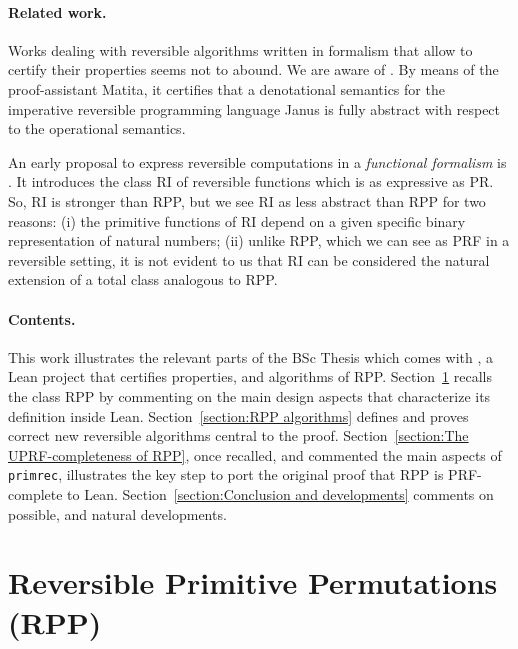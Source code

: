 \documentclass[runningheads]{llncs}
\newcommand{\RPP}{\textsf{RPP}\xspace}
\newcommand{\PRF}{\textsf{PRF}\xspace}
\newcommand{\PR}{\textsf{PR}\xspace}
\newcommand{\LEAN}{\textsf{Lean}\xspace}
\newcommand{\JMF}{\textsf{RI}\xspace} %
\newcommand{\Janus}{\textsf{Janus}\xspace}
\newcommand{\Matita}{\textsf{Matita}\xspace}
\begin{document}
\paragraph{Related work.}
Works dealing with reversible algorithms written in formalism that allow to certify their properties seems not to abound. We are aware of \cite{paoliniTYPES2015}. By means of the proof-assistant \Matita \cite{Asperti2007}, it certifies that a denotational semantics for the imperative reversible programming language \Janus \cite[Section 8.3.3]{perumalla2013chc} is fully abstract with respect to the operational semantics.

An early proposal to express reversible computations in a \emph{functional formalism} is \cite{jacopini89tcs}. It introduces the class \JMF of reversible functions which is as expressive as \PR. So, \JMF is stronger than \RPP, but we see \JMF as less abstract than \RPP for two reasons: (i) the primitive functions of \JMF depend on a given specific binary representation of natural numbers; (ii) unlike \RPP, which we can see as \PRF in a reversible setting, it is not evident to us that \JMF can be considered the natural extension of a total class analogous to \RPP.

\paragraph{Contents.}
This work illustrates the relevant parts of the BSc Thesis \cite{MalettoBSc2021} which comes with \cite{MalettoRPPLEAN2021}, a \LEAN project that certifies properties, and algorithms of \RPP.
Section~\ref{section:Reversible Primitive Permutations} recalls the class \RPP by commenting on the main design aspects that characterize its definition inside \LEAN.
Section~\ref{section:RPP algorithms} defines and proves correct new reversible algorithms central to the proof.
Section~\ref{section:The UPRF-completeness of RPP}, once recalled, and commented the main aspects of \lstinline|primrec|, illustrates the key step to port the original proof that \RPP is \PRF-complete to \LEAN.
Section~\ref{section:Conclusion and developments} comments on possible, and natural developments.

\section{Reversible Primitive Permutations (\RPP) }
\label{section:Reversible Primitive Permutations}
\end{document}
